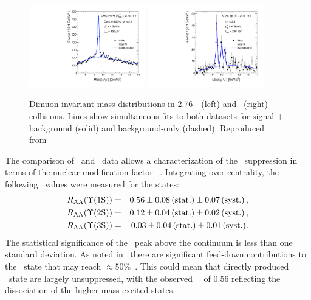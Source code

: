 \begin{figure}[t]
\begin{center}
    \includegraphics[width=0.45\textwidth]{qqbarfigures/hiFitPt4Erf}
    \includegraphics[width=0.45\textwidth]{qqbarfigures/ppFitPt4Erf}
    \caption{Dimuon invariant-mass distributions in 2.76\TeV\ \PbPb\ (left) and \pp\ (right)
collisions.  Lines show simultaneous fits to both
datasets for signal + background (solid) and background-only (dashed).
Reproduced from~\cite{Chatrchyan:2012lxa}}
\label{fig:GR:mass}
\end{center}
\end{figure}

The comparison of \pp\ and \PbPb\ data allows a characterization of the \PgU\ suppression
in terms of the nuclear modification factor \Raa~\cite{Chatrchyan:2012lxa}.
Integrating over centrality, the following \Raa\ values were measured for the \PgUn states:
\begin{eqnarray}
R_\mathrm{AA} (\Upsilon\mathrm{(1S)}) &=& 0.56 \pm 0.08\,\mbox{(stat.)} \pm 0.07\,\mbox{(syst.)} \,, \\
R_\mathrm{AA} (\Upsilon\mathrm{(2S)}) &=& 0.12 \pm 0.04\,\mbox{(stat.)} \pm 0.02\,\mbox{(syst.)} \,, \nonumber \\
R_\mathrm{AA} (\Upsilon\mathrm{(3S)}) &=& 0.03 \pm 0.04\,\mbox{(stat.)} \pm 0.01\,\mbox{(syst.)} .  \nonumber
\end{eqnarray}
The statistical significance of the \PgUc\ peak above the continuum is less than one standard deviation.
As noted in~\cite{Chatrchyan:2012lxa} there are significant feed-down contributions to
the \PgUa\ state that may reach $\approx 50\%$~\cite{Affolder:1999wm, Aaij:2012se}.
This could mean that directly produced \PgUa\ state are largely unsuppressed, with
the observed \PgUa\ \Raa\ of 0.56 reflecting the dissociation of the higher 
mass excited states.

